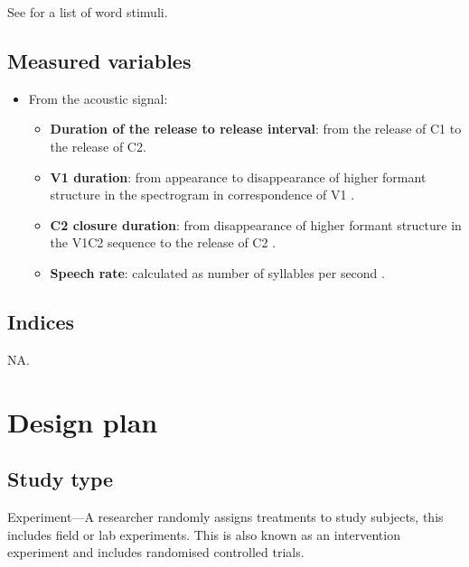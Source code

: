 \documentclass[11pt,]{article}
\providecommand{\tightlist}{%
  \setlength{\itemsep}{0pt}\setlength{\parskip}{0pt}}
\begin{document}
See  for a list of word stimuli.

\hypertarget{measured-variables}{%
\subsection{Measured variables}\label{measured-variables}}

\begin{itemize}
\tightlist
\item
  From the acoustic signal:

  \begin{itemize}
  \tightlist
  \item
    \textbf{Duration of the release to release interval}: from the
    release of C1 to the release of C2.
  \item
    \textbf{V1 duration}: from appearance to disappearance of higher
    formant structure in the spectrogram in correspondence of V1
    \citep{machac2009}.
  \item
    \textbf{C2 closure duration}: from disappearance of higher formant
    structure in the V1C2 sequence to the release of C2
    \citep{machac2009}.
  \item
    \textbf{Speech rate}: calculated as number of syllables per second
    \citep[\texttt{n\ of\ syllables\ in\ the\ sentence\ /\ sentence\ duration},][]{plug2018}.
  \end{itemize}
\end{itemize}

\hypertarget{indices}{%
\subsection{Indices}\label{indices}}

NA.

\hypertarget{design-plan}{%
\section{Design plan}\label{design-plan}}

\hypertarget{study-type}{%
\subsection{Study type}\label{study-type}}

Experiment---A researcher randomly assigns treatments to study subjects,
this includes field or lab experiments. This is also known as an
intervention experiment and includes randomised controlled trials.
\end{document}
